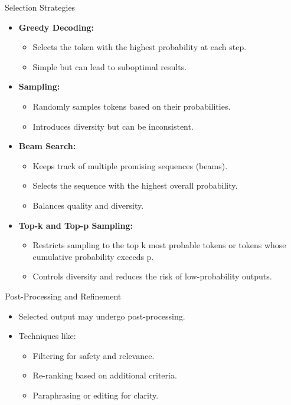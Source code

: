 \documentclass{beamer}
\begin{document}
\begin{frame}{Selection Strategies}
  \begin{itemize}
    \item \textbf{Greedy Decoding:}
      \begin{itemize}
        \item Selects the token with the highest probability at each step.
        \item Simple but can lead to suboptimal results.
      \end{itemize}
    \item \textbf{Sampling:}
      \begin{itemize}
        \item Randomly samples tokens based on their probabilities.
        \item Introduces diversity but can be inconsistent.
      \end{itemize}
    \item \textbf{Beam Search:}
      \begin{itemize}
        \item Keeps track of multiple promising sequences (beams).
        \item Selects the sequence with the highest overall probability.
        \item Balances quality and diversity.
      \end{itemize}
    \item \textbf{Top-k and Top-p Sampling:}
      \begin{itemize}
        \item Restricts sampling to the top k most probable tokens or tokens whose cumulative probability exceeds p.
        \item Controls diversity and reduces the risk of low-probability outputs.
      \end{itemize}
  \end{itemize}
\end{frame}

\begin{frame}{Post-Processing and Refinement}
  \begin{itemize}
    \item Selected output may undergo post-processing.
    \item Techniques like:
      \begin{itemize}
        \item Filtering for safety and relevance.
        \item Re-ranking based on additional criteria.
        \item Paraphrasing or editing for clarity.
      \end{itemize}
  \end{itemize}
\end{frame}
\end{document}
